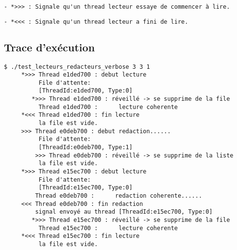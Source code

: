 \documentclass[11pt]{article}
\theoremstyle{definition}
\theoremstyle{definition}
\begin{document}
\begin{lstlisting}[columns=fixed,basicstyle=\scriptsize\ttfamily]
  - *>>> : Signale qu'un thread lecteur essaye de commencer à lire.
\end{lstlisting}

\begin{lstlisting}[columns=fixed,basicstyle=\scriptsize\ttfamily]
  - *<<< : Signale qu'un thread lecteur a fini de lire.
\end{lstlisting}

\subsection{Trace d'exécution}
\begin{lstlisting}[columns=fixed,basicstyle=\scriptsize\ttfamily]
  $ ./test_lecteurs_redacteurs_verbose 3 3 1
     *>>> Thread e1ded700 : debut lecture
          File d'attente:
          [ThreadId:e1ded700, Type:0]
        *>>> Thread e1ded700 : réveillé -> se supprime de la file
          Thread e1ded700 :      lecture coherente
     *<<< Thread e1ded700 : fin lecture
          la file est vide.
     >>> Thread e0deb700 : debut redaction......
          File d'attente:
          [ThreadId:e0deb700, Type:1]
         >>> Thread e0deb700 : réveillé -> se supprime de la liste
          la file est vide.
     *>>> Thread e15ec700 : debut lecture
          File d'attente:
          [ThreadId:e15ec700, Type:0]
         Thread e0deb700 :      redaction coherente......
     <<< Thread e0deb700 : fin redaction
         signal envoyé au thread [ThreadId:e15ec700, Type:0]
        *>>> Thread e15ec700 : réveillé -> se supprime de la file
          Thread e15ec700 :      lecture coherente
     *<<< Thread e15ec700 : fin lecture
          la file est vide.
\end{lstlisting}
\end{document}

